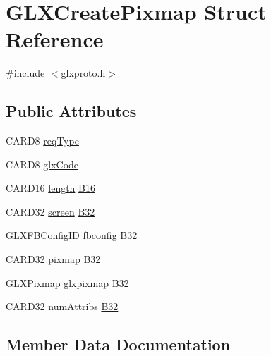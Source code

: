 \hypertarget{struct_g_l_x_create_pixmap}{}\section{G\+L\+X\+Create\+Pixmap Struct Reference}
\label{struct_g_l_x_create_pixmap}


{\ttfamily \#include $<$glxproto.\+h$>$}

\subsection*{Public Attributes}
\begin{DoxyCompactItemize}
\item 
C\+A\+R\+D8 \hyperlink{struct_g_l_x_create_pixmap_a9d019e51b6e5f6cca383a2fcfebbba79}{req\+Type}
\item 
C\+A\+R\+D8 \hyperlink{struct_g_l_x_create_pixmap_abfeb9b8e2b34d09a9c36bce494174afa}{glx\+Code}
\item 
C\+A\+R\+D16 \hyperlink{glcorearb_8h_ab9c919755bde3b34349e23a32b4e0fa7}{length} \hyperlink{struct_g_l_x_create_pixmap_a22673f3943a26d603cdcb77e3869b784}{B16}
\item 
C\+A\+R\+D32 \hyperlink{cad_8h_ae04e09e4e3831bfc1632c509ae37dcec}{screen} \hyperlink{struct_g_l_x_create_pixmap_a1fdd877ff6aadfbc975a3c6a5f346bf8}{B32}
\item 
\hyperlink{glx_8h_a38e78acefebf732d1a0da441ad1de05f}{G\+L\+X\+F\+B\+Config\+ID} fbconfig \hyperlink{struct_g_l_x_create_pixmap_ada58bd8021e1cbed41d007f078df4995}{B32}
\item 
C\+A\+R\+D32 pixmap \hyperlink{struct_g_l_x_create_pixmap_a7dced89843368523fd47fe2ca5d9dcde}{B32}
\item 
\hyperlink{glx_8h_a6577d581069de43ebaac50c78dbccbd0}{G\+L\+X\+Pixmap} glxpixmap \hyperlink{struct_g_l_x_create_pixmap_a367c773b0307945df0a9d25b4b93c1ad}{B32}
\item 
C\+A\+R\+D32 num\+Attribs \hyperlink{struct_g_l_x_create_pixmap_a7d976ed471ab8ab1dc423e26e3e0c483}{B32}
\end{DoxyCompactItemize}


\subsection{Member Data Documentation}
\mbox{\label{struct_g_l_x_create_pixmap_a22673f3943a26d603cdcb77e3869b784}} 
